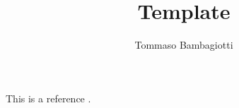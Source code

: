 \documentclass[11pt]{article}
\title{Template}
\author{Tommaso Bambagiotti}
\begin{document}
	\maketitle
	This is a reference \cite{art}.	
	\clearpage %

	

	\appendix
	\appendixpage
	
	\newpage

	
	\printbibliography

	\newpage
\end{document}
